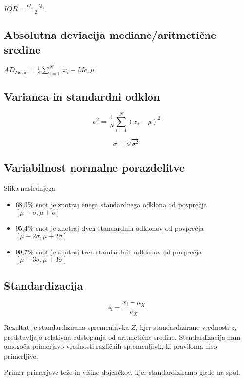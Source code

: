 $IQR =\frac{Q_3 -Q_1}{2}$

\subsection*{Absolutna deviacija mediane/aritmetične sredine}

$AD_{Me,\mu}=\frac{1}{N}\sum_{i=1}^{N}|x_i - Me,\mu|$

\subsection*{Varianca in standardni odklon}

\[\sigma^2 = \frac{1}{N} \sum_{i=1}^{N} (x_i - \mu)^2\]

\[\sigma = \sqrt{\sigma^2}\]

\subsection*{Variabilnost normalne porazdelitve}

Slika naslednjega

\begin{itemize}
    \item 68,3\% enot je znotraj enega standardnega odklona od povprečja \([\mu - \sigma, \mu + \sigma]\)
    \item 95,4\% enot je znotraj dveh standardnih odklonov od povprečja \([\mu - 2\sigma, \mu + 2\sigma]\)
    \item 99,7\% enot je znotraj treh standardnih odklonov od povprečja \([\mu - 3\sigma, \mu + 3\sigma]\)
\end{itemize}

\subsection*{Standardizacija}

\[z_i = \frac{x_i - \mu_X}{\sigma_X}\]

Rezultat je standardizirana spremenljivka $Z$, kjer standardizirane vrednosti $z_i$ predstavljajo relativna odstopanja od aritmetične sredine. Standardizacija nam omogoča primerjavo vrednosti različnih spremenljivk, ki praviloma niso primerljive.

Primer primerjave teže in višine dojenčkov, kjer standardiziramo glede na spol.


